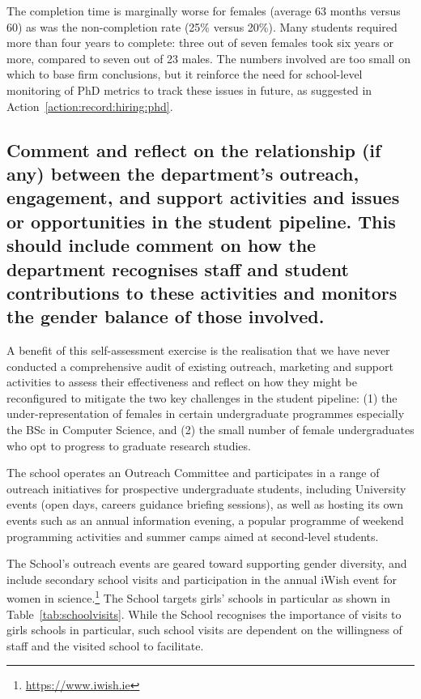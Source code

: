 The completion time is marginally  worse for females (average 63 
months versus 60) as was the non-completion rate (25\% versus 20\%).  
Many students required more than four years to complete: three out 
of seven females took six years or more, compared to seven out of 
23 males. The numbers involved are too small on which to base firm 
conclusions, but it reinforce the need for school-level monitoring 
of PhD metrics to track these issues in future, as suggested in 
Action~\ref{action:record:hiring:phd}.


\subsection{Comment and reflect on the relationship (if any) between the department’s outreach, engagement, and support activities and issues or opportunities in the student pipeline. This should include comment on how the department recognises staff and student contributions to these activities and monitors the gender balance of those involved.}


A benefit of this self-assessment exercise is the realisation 
that we have never conducted a comprehensive audit of existing 
outreach, marketing and support activities to assess their 
effectiveness and reflect on how they might be reconfigured to 
mitigate the two key challenges in the student pipeline:
(1) the under-representation of females in certain undergraduate
programmes especially the BSc in Computer Science, and 
(2) the  small number of female undergraduates
who opt to progress to graduate research studies.


The school operates an Outreach Committee and participates in  a
range of outreach initiatives for prospective undergraduate 
students, including University events  (open days, careers 
guidance briefing sessions),  as well as hosting its own events 
such as an annual information evening, a popular programme of 
weekend programming activities and summer camps aimed at 
second-level students.

The School's outreach events are geared toward supporting gender 
diversity, and include secondary school visits and participation 
in the annual iWish event for women in science.\footnote{\url{https://www.iwish.ie}} 
The School targets girls' schools in particular as shown in 
Table~\ref{tab:schoolvisits}. 
While the School recognises the importance of visits to girls schools 
in particular, such school visits are dependent on the willingness 
of staff and the visited school to facilitate. 

